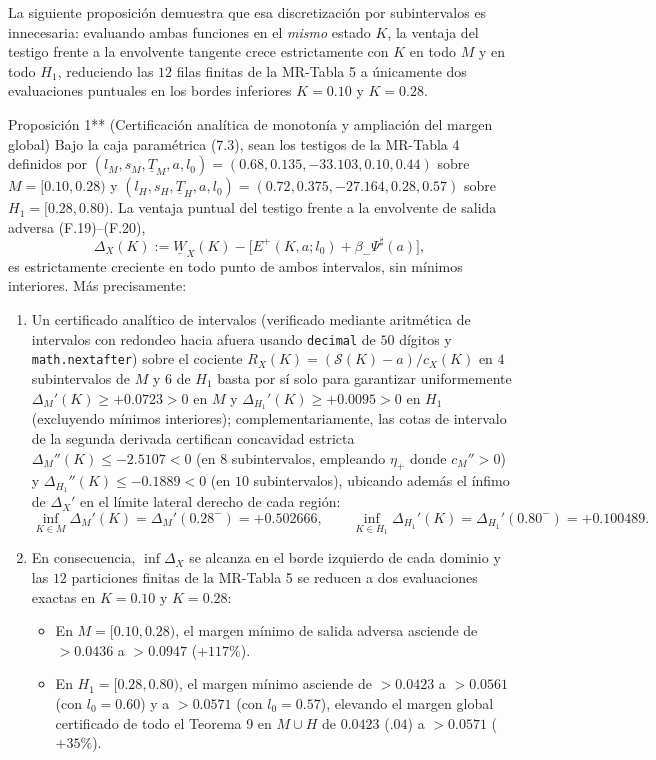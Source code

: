 \documentclass[11pt,letterpaper]{article}
\theoremstyle{plain}
\newtheorem*{namedthm}{\protect\namedthmname}
\newcommand{\namedthmname}{}
\newenvironment{thm_box}[1]{\renewcommand{\namedthmname}{#1}\begin{namedthm}}{\end{namedthm}}
\begin{document}
La siguiente proposición demuestra que esa discretización por subintervalos es innecesaria: evaluando ambas funciones en el \emph{mismo} estado $K$, la ventaja del testigo frente a la envolvente tangente crece estrictamente con $K$ en todo $M$ y en todo $H_1$, reduciendo las $12$ filas finitas de la MR-Tabla 5 a únicamente dos evaluaciones puntuales en los bordes inferiores $K=0.10$ y $K=0.28$.

\begin{thm_box}{Proposición 1** (Certificación analítica de monotonía y ampliación del margen global)}
Bajo la caja paramétrica (7.3), sean los testigos de la MR-Tabla 4 definidos por $(l_M,s_M,\underline{T}_M,a,l_0)=(0.68,0.135,-33.103,0.10,0.44)$ sobre $M=[0.10,0.28)$ y $(l_H,s_H,\underline{T}_H,a,l_0)=(0.72,0.375,-27.164,0.28,0.57)$ sobre $H_1=[0.28,0.80)$. La ventaja puntual del testigo frente a la envolvente de salida adversa (F.19)--(F.20),
\[
\Delta_X(K) := \underline{W}_X(K) - \big[E^+(K,a;l_0)+\beta_-\Psi^\sharp(a)\big],
\]
es estrictamente creciente en todo punto de ambos intervalos, sin mínimos interiores. Más precisamente:
\begin{enumerate}
\item Un certificado analítico de intervalos (verificado mediante aritmética de intervalos con redondeo hacia afuera usando \texttt{decimal} de $50$ dígitos y \texttt{math.nextafter}) sobre el cociente $R_X(K)=(\mathcal{S}(K)-a)/c_X(K)$ en $4$ subintervalos de $M$ y $6$ de $H_1$ basta por sí solo para garantizar uniformemente $\Delta_M'(K)\ge +0.0723 > 0$ en $M$ y $\Delta_{H_1}'(K)\ge +0.0095 > 0$ en $H_1$ (excluyendo mínimos interiores); complementariamente, las cotas de intervalo de la segunda derivada certifican concavidad estricta $\Delta_M''(K)\le -2.5107 < 0$ (en $8$ subintervalos, empleando $\eta_+$ donde $c_M''>0$) y $\Delta_{H_1}''(K)\le -0.1889 < 0$ (en $10$ subintervalos), ubicando además el ínfimo de $\Delta_X'$ en el límite lateral derecho de cada región:
\[
\inf_{K\in M}\Delta_M'(K) = \Delta_M'(0.28^-) = +0.502666, \qquad \inf_{K\in H_1}\Delta_{H_1}'(K) = \Delta_{H_1}'(0.80^-) = +0.100489.
\]
\item En consecuencia, $\inf\Delta_X$ se alcanza en el borde izquierdo de cada dominio y las $12$ particiones finitas de la MR-Tabla 5 se reducen a dos evaluaciones exactas en $K=0.10$ y $K=0.28$:
\begin{itemize}
\item En $M=[0.10,0.28)$, el margen mínimo de salida adversa asciende de $>0.0436$ a \textbf{$>0.0947$} ($+117\%$).
\item En $H_1=[0.28,0.80)$, el margen mínimo asciende de $>0.0423$ a $>0.0561$ (con $l_0=0.60$) y a \textbf{$>0.0571$} (con $l_0=0.57$), elevando el margen global certificado de todo el Teorema 9 en $M\cup H$ de $0.0423$ ($.04$) a \textbf{$>0.0571$} ($+35\%$).
\end{itemize}
\end{enumerate}
\end{thm_box}
\end{document}

